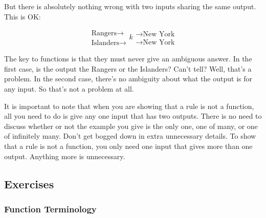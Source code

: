But there is absolutely nothing wrong with two inputs sharing the same output. This is OK:

$$\begin{array}{l} \text{Rangers} \rightarrow \\ \text{Islanders} \rightarrow \end{array} \boxed{k} \begin{array}{l} \rightarrow \text{New York}\\ \rightarrow  \text{New York} \end{array}$$

The key to functions is that they must never give an ambiguous answer. In the first case, is the output the Rangers or the Islanders? Can’t tell? Well, that’s a problem. In the second case, there’s no ambiguity about what the output is for any input. So that’s not a problem at all.



It is important to note that when you are showing that a rule is not a function, all you need to do is give any one input that has two outputs. There is no need to discuss whether or not the example you give is the only one, one of many, or one of infinitely many. Don’t get bogged down in extra unnecessary details. To show
that a rule is not a function, you only need one input that gives more than one output. Anything more is unnecessary.

%
%

\clearpage

\subsection{Exercises}

\subsubsection*{Function Terminology}

